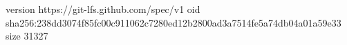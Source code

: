 version https://git-lfs.github.com/spec/v1
oid sha256:238dd3074f85fc00c911062c7280ed12b2800ad3a7514fe5a74db04a01a59e33
size 31327
